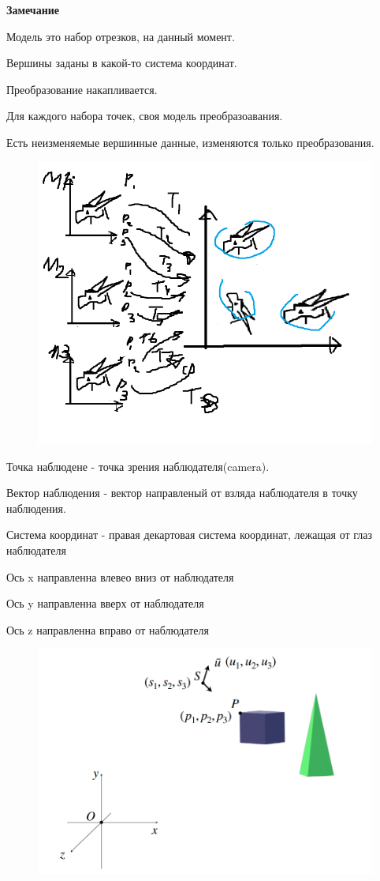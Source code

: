 \documentclass{article}
\begin{document}
\textbf{Замечание}

Модель это набор отрезков, на данный момент.

Вершины заданы в какой-то система координат.

Преобразование накапливается.

Для каждого набора точек, своя модель преобразоавания.

Есть неизменяемые вершинные данные, изменяются только преобразования.


\begin{figure} [H]
    \includegraphics[width=0.70\linewidth]{пре.png}
\end{figure}

\vspace{1cm}

Точка наблюдене - точка зрения наблюдателя(camera). 

Вектор наблюдения - вектор направленый от взляда наблюдателя в точку наблюдения.

Система координат - правая декартовая система координат, лежащая от глаз наблюдателя

Ось x направленна влевео вниз от наблюдателя

Ось y направленна вверх от наблюдателя

Ось z направленна вправо от наблюдателя

\begin{figure} [H]
    \includegraphics[width=0.70\linewidth]{Снимок экрана 2025-03-31 125809.png}
\end{figure}
\end{document}
